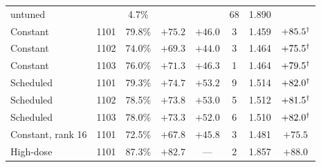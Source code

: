 \documentclass[11pt]{article}
\begin{document}
\begin{table}[t]
\begin{tabular}{@{}l c c c c c c c@{}}
    untuned & & 4.7\% & & & 68 & 1.890 & \\
    Constant & 1101 & 79.8\% & $+75.2$ & $+46.0$ & 3 & 1.459 & $+85.5^{\smash{\dagger}}$ \\
    Constant & 1102 & 74.0\% & $+69.3$ & $+44.0$ & 3 & 1.464 & $+75.5^{\smash{\dagger}}$ \\
    Constant & 1103 & 76.0\% & $+71.3$ & $+46.3$ & 1 & 1.464 & $+79.5^{\smash{\dagger}}$ \\
    Scheduled & 1101 & 79.3\% & $+74.7$ & $+53.2$ & 9 & 1.514 & $+82.0^{\smash{\dagger}}$ \\
    Scheduled & 1102 & 78.5\% & $+73.8$ & $+53.0$ & 5 & 1.512 & $+81.5^{\smash{\dagger}}$ \\
    Scheduled & 1103 & 78.0\% & $+73.3$ & $+52.0$ & 6 & 1.510 & $+82.0^{\smash{\dagger}}$ \\
    Constant, rank 16 & 1101 & 72.5\% & $+67.8$ & $+45.8$ & 3 & 1.481 & $+75.5$ \\
    High-dose & 1101 & 87.3\% & $+82.7$ & --- & 2 & 1.857 & $+88.0$ \\

\end{tabular}
\end{table}
\end{document}
